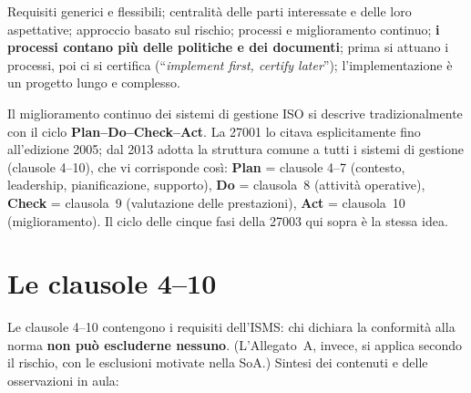 \begin{nota}
Requisiti generici e flessibili; centralità delle parti interessate e delle loro aspettative; approccio
basato sul rischio; processi e miglioramento continuo; \textbf{i processi contano più delle politiche e dei
documenti}; prima si attuano i processi, poi ci si certifica (``\emph{implement first, certify later}'');
l'implementazione è un progetto lungo e complesso.
\end{nota}

\begin{integrazione}
Il miglioramento continuo dei sistemi di gestione ISO si descrive tradizionalmente con il ciclo
\textbf{Plan--Do--Check--Act}. La 27001 lo citava esplicitamente fino all'edizione 2005; dal 2013 adotta la
struttura comune a tutti i sistemi di gestione (clausole 4--10), che vi corrisponde così: \textbf{Plan} =
clausole 4--7 (contesto, leadership, pianificazione, supporto), \textbf{Do} = clausola~8 (attività
operative), \textbf{Check} = clausola~9 (valutazione delle prestazioni), \textbf{Act} = clausola~10
(miglioramento). Il ciclo delle cinque fasi della 27003 qui sopra è la stessa idea.
\end{integrazione}

\section{Le clausole 4--10}
\label{sec:iso-clausole}
Le clausole 4--10 contengono i requisiti dell'ISMS: chi dichiara la conformità alla norma \textbf{non può
escluderne nessuno}. (L'Allegato~A, invece, si applica secondo il rischio, con le esclusioni motivate nella
SoA.) Sintesi dei contenuti e delle osservazioni in aula:

